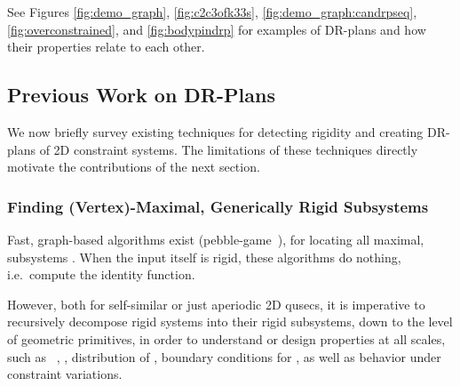 See Figures \ref{fig:demo_graph}, \ref{fig:c2c3ofk33s}, \ref{fig:demo_graph:candrpseq}, \ref{fig:overconstrained}, and \ref{fig:bodypindrp} for examples of DR-plans and how their properties relate to each other.


\subsection{Previous Work on DR-Plans}
\label{sec:prev}
We now briefly survey existing techniques for detecting rigidity and creating DR-plans of 2D constraint systems. The limitations of these techniques directly motivate the contributions of the next  section.

\subsubsection{Finding (Vertex)-Maximal, Generically Rigid Subsystems}
Fast, graph-based algorithms exist (pebble-game~\cite{Jacobs:1997:PG,hoffmann1997solvablesubsets,jermann2006decomposition,Lee:2007:PGA}), for locating all maximal,  subsystems \seedefs. When the input itself is rigid, these algorithms do nothing, i.e.\ compute the identity function.

However, both for self-similar or just aperiodic 2D qusecs, it is imperative to recursively decompose rigid systems into their rigid subsystems, down to the level of geometric primitives, in order to understand or design properties at all scales, such as \seedefs\ , , distribution of , boundary conditions for , as well as behavior under constraint variations.

